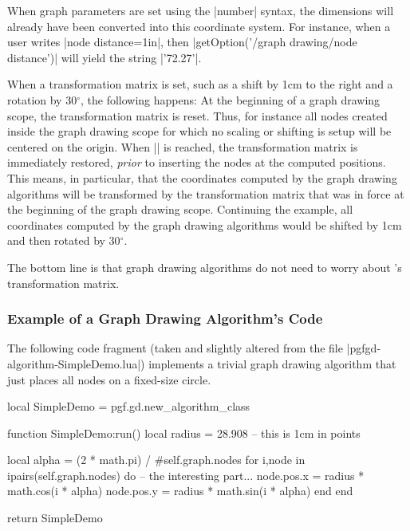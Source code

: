When graph parameters are set using the |number|
syntax, the dimensions will already have been converted into this
coordinate system. For instance, when a user writes
|node distance=1in|, then |getOption('/graph drawing/node distance')|
will yield the string |'72.27'|.

When a transformation matrix is
set, such as a shift by 1cm to the right and a rotation by
30$^\circ$, the following happens: At the beginning of a
graph drawing scope, the transformation matrix is reset. Thus, for
instance all nodes created inside the graph drawing scope for which no
scaling or shifting is setup will be centered on the origin. When
|\pgfgdendscope| is reached, the transformation matrix is immediately
restored, \emph{prior} to inserting the nodes at the computed
positions. This means, in particular, that the coordinates computed by
the graph drawing algorithms will be transformed by the transformation
matrix that was in force at the beginning of the graph drawing
scope. Continuing the example, all coordinates computed by the graph
drawing algorithms would be shifted by 1cm and then rotated by
30$^\circ$.

The bottom line is that graph drawing algorithms do not need to worry
about \pgfname's transformation matrix.



\subsubsection{Example of a Graph Drawing Algorithm's Code}

The following code fragment (taken and slightly altered
from the file |pgfgd-algorithm-SimpleDemo.lua|)
implements a trivial graph drawing algorithm that just places all
nodes on a fixed-size circle.  



\begin{codeexample}
local SimpleDemo = pgf.gd.new_algorithm_class {}

function SimpleDemo:run()
  local radius = 28.908  -- this is 1cm in points

  local alpha = (2 * math.pi) / #self.graph.nodes
  for i,node in ipairs(self.graph.nodes) do
    -- the interesting part...
    node.pos.x = radius * math.cos(i * alpha)
    node.pos.y = radius * math.sin(i * alpha)
  end
end

return SimpleDemo
\end{codeexample}


